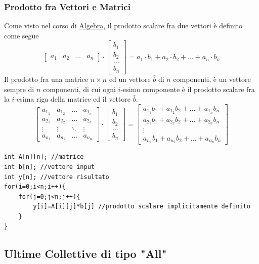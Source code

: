 \documentclass[10pt, letterpaper]{report}
\begin{document}
\subsubsection{Prodotto fra Vettori e Matrici}
Come visto nel corso di 
\color{blue}\href{https://github.com/CasuFrost/University_notes/blob/main/Secondo%20Anno/Primo%20Semestre/Algebra/Latex%20source%20file/Algebra.pdf}{Algebra}\color{black}, 
il prodotto scalare fra due vettori è definito come segue 
$$ \begin{bmatrix}
    a_1&a_2&\dots&a_n
\end{bmatrix}\cdot \begin{bmatrix}
    b_1\\b_2\\\dots\\b_n
\end{bmatrix}=a_1\cdot b_1 + a_2\cdot b_2+\dots + a_n\cdot b_n$$
Il prodotto fra una matrice $n\times n$ ed un vettore $\bar b$ di $n$ componenti, è un vettore sempre di 
$n$ componenti, di cui ogni $i$-esimo componente è il prodotto scalare fra la $i$-esima riga della matrice 
ed il vettore $\bar b$. 
$$ \begin{bmatrix}
    a_{1_1}&a_{1_2}&\dots&a_{1_n}\\ 
    a_{2_1}&a_{2_2}&\dots&a_{2_n}\\ 
    \vdots & \vdots &\ddots & \vdots\\ 
    a_{n_1}&a_{n_2}&\dots&a_{n_n}
\end{bmatrix}\cdot \begin{bmatrix}
    b_1\\b_2\\\dots\\b_n
\end{bmatrix}=\begin{bmatrix}
    a_{1_1}b_1+a_{1_2}b_2+\dots+a_{1_n}b_n\\
    a_{2_1}b_1+a_{2_2}b_2+\dots+a_{2_n}b_n\\
    \vdots\\
    a_{n_1}b_1+a_{n_2}b_2+\dots+a_{n_n}b_n
\end{bmatrix}$$
\begin{lstlisting}[style=CStyle]
int A[n][n]; //matrice 
int b[n]; //vettore input
int y[n]; //vettore risultato
for(i=0;i<n;i++){
    for(j=0;j<n;j++){
        y[i]=A[i][j]*b[j] //prodotto scalare implicitamente definito
    }
}
\end{lstlisting}








\newpage\subsection{Ultime Collettive di tipo "All"}
\end{document}
